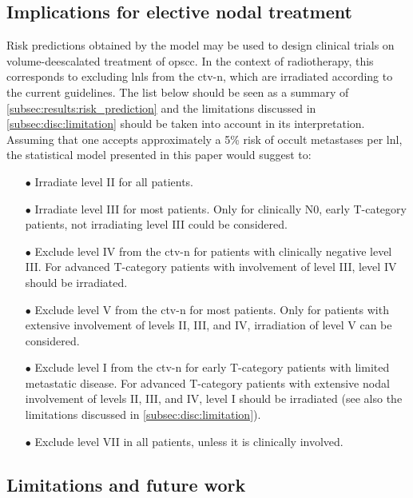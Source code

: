 \documentclass[twocolumn]{aastex631}
\begin{document}
\subsection{Implications for elective nodal treatment} 
Risk predictions obtained by the model may be used to design clinical trials on volume-deescalated treatment of \gls{opscc}. In the context of radiotherapy, this corresponds to excluding \glspl{lnl} from the \gls{ctv-n}, which are irradiated according to the current guidelines. The list below should be seen as a summary of \autoref{subsec:results:risk_prediction} and the limitations discussed in \autoref{subsec:disc:limitation} should be taken into account in its interpretation. Assuming that one accepts approximately a 5\% risk of occult metastases per \gls{lnl}, the statistical model presented in this paper would suggest to:
\begin{itemize}
    \item[$\bullet$] Irradiate level II for all patients.
    \item[$\bullet$] Irradiate level III for most patients. Only for clinically N0, early T-category patients, not irradiating level III could be considered. 
    \item[$\bullet$] Exclude level IV from the \gls{ctv-n} for patients with clinically negative level III. For advanced T-category patients with involvement of level III, level IV should be irradiated.
    \item[$\bullet$] Exclude level V from the \gls{ctv-n} for most patients. Only for patients with extensive involvement of levels II, III, and IV, irradiation of level V can be considered.
    \item[$\bullet$] Exclude level I from the \gls{ctv-n} for early T-category patients with limited metastatic disease. For advanced T-category patients with extensive nodal involvement of levels II, III, and IV, level I should be irradiated (see also the limitations discussed in \autoref{subsec:disc:limitation}).
    \item[$\bullet$] Exclude level VII in all patients, unless it is clinically involved.
\end{itemize}

\subsection{Limitations and future work}
\label{subsec:disc:limitation}
\end{document}
